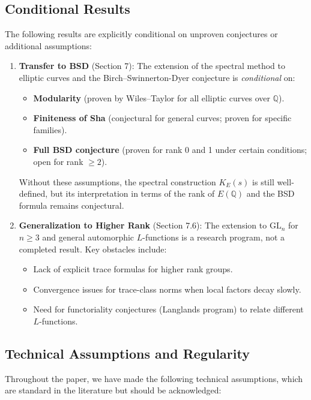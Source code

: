 \subsection{Conditional Results}

The following results are explicitly conditional on unproven conjectures or additional assumptions:

\begin{enumerate}
\item \textbf{Transfer to BSD} (Section 7): The extension of the spectral method to elliptic curves and the Birch–Swinnerton-Dyer conjecture is \emph{conditional} on:
\begin{itemize}
\item \textbf{Modularity} (proven by Wiles–Taylor for all elliptic curves over $\mathbb{Q}$).
\item \textbf{Finiteness of Sha} (conjectural for general curves; proven for specific families).
\item \textbf{Full BSD conjecture} (proven for rank 0 and 1 under certain conditions; open for rank $\geq 2$).
\end{itemize}

Without these assumptions, the spectral construction $K_E(s)$ is still well-defined, but its interpretation in terms of the rank of $E(\mathbb{Q})$ and the BSD formula remains conjectural.

\item \textbf{Generalization to Higher Rank} (Section 7.6): The extension to $\mathrm{GL}_n$ for $n \geq 3$ and general automorphic $L$-functions is a research program, not a completed result. Key obstacles include:
\begin{itemize}
\item Lack of explicit trace formulas for higher rank groups.
\item Convergence issues for trace-class norms when local factors decay slowly.
\item Need for functoriality conjectures (Langlands program) to relate different $L$-functions.
\end{itemize}
\end{enumerate}

\subsection{Technical Assumptions and Regularity}

Throughout the paper, we have made the following technical assumptions, which are standard in the literature but should be acknowledged:

